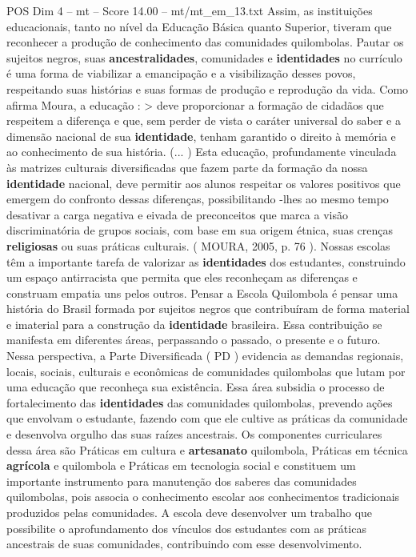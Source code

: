 \begin{textsample}{POS Dim 4 – mt – Score 14.00 – mt/mt\_em\_13.txt}
Assim, as instituições educacionais, tanto no nível da Educação Básica quanto Superior, tiveram que reconhecer a produção de conhecimento das comunidades quilombolas.
Pautar os sujeitos negros, suas \textbf{ancestralidades}, comunidades e \textbf{identidades} no currículo é uma forma de viabilizar a emancipação e a visibilização desses povos, respeitando suas histórias e suas formas de produção e reprodução da vida.
Como afirma Moura, a educação : > deve proporcionar a formação de cidadãos que respeitem a diferença e que, sem perder de vista o caráter universal do saber e a dimensão nacional de sua \textbf{identidade}, tenham garantido o direito à memória e ao conhecimento de sua história. (... ) Esta educação, profundamente vinculada às matrizes culturais diversificadas que fazem parte da formação da nossa \textbf{identidade} nacional, deve permitir aos alunos respeitar os valores positivos que emergem do confronto dessas diferenças, possibilitando -lhes ao mesmo tempo desativar a carga negativa e eivada de preconceitos que marca a visão discriminatória de grupos sociais, com base em sua origem étnica, suas crenças \textbf{religiosas} ou suas práticas culturais. ( MOURA, 2005, p. 76 ).
Nossas escolas têm a importante tarefa de valorizar as \textbf{identidades} dos estudantes, construindo um espaço antirracista que permita que eles reconheçam as diferenças e construam empatia uns pelos outros.
Pensar a Escola Quilombola é pensar uma história do Brasil formada por sujeitos negros que contribuíram de forma material e imaterial para a construção da \textbf{identidade} brasileira.
Essa contribuição se manifesta em diferentes áreas, perpassando o passado, o presente e o futuro.
Nessa perspectiva, a Parte Diversificada ( PD ) evidencia as demandas regionais, locais, sociais, culturais e econômicas de comunidades quilombolas que lutam por uma educação que reconheça sua existência.
Essa área subsidia o processo de fortalecimento das \textbf{identidades} das comunidades quilombolas, prevendo ações que envolvam o estudante, fazendo com que ele cultive as práticas da comunidade e desenvolva orgulho das suas raízes ancestrais.
Os componentes curriculares dessa área são Práticas em cultura e \textbf{artesanato} quilombola, Práticas em técnica \textbf{agrícola} e quilombola e Práticas em tecnologia social e constituem um importante instrumento para manutenção dos saberes das comunidades quilombolas, pois associa o conhecimento escolar aos conhecimentos tradicionais produzidos pelas comunidades.
A escola deve desenvolver um trabalho que possibilite o aprofundamento dos vínculos dos estudantes com as práticas ancestrais de suas comunidades, contribuindo com esse desenvolvimento.

\end{textsample}
